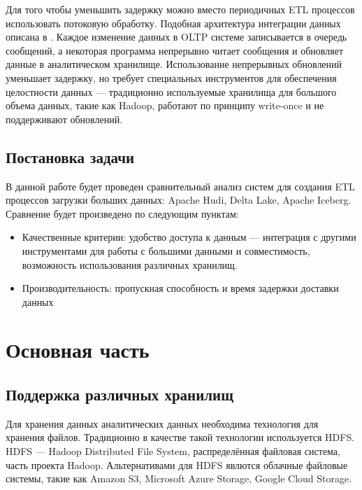 \documentclass[%
bachelor,    %
subf,        %
href,        %
colorlinks,  %
]{disser}
\begin{document}
Для того чтобы уменьшить задержку можно вместо периодичных ETL процессов использовать потоковую обработку.
Подобная архитектура интеграции данных описана в \cite{streaming_integration} \cite{streaming_integration_2}.
Каждое изменение данных в OLTP системе записывается в очередь сообщений, а некоторая программа непрерывно читает сообщения и обновляет данные в аналитическом хранилище.
Использование непрерывных обновлений уменьшает задержку, но требует специальных инструментов для обеспечения целостности данных --- традиционно используемые хранилища для большого объема данных, такие как Hadoop, работают по принципу write-once и не поддерживают обновлений.

\subsection{Постановка задачи}
В данной работе будет проведен сравнительный анализ систем для создания ETL процессов загрузки больших данных: Apache Hudi, Delta Lake, Apache Iceberg.
Сравнение будет произведено по следующим пунктам:
\begin{itemize}
	\item Качественные критерии: удобство доступа к данным --- интеграция с другими инструментами для работы с большими данными и совместимость, возможность использования различных хранилищ.

	\item Производительность: пропускная способность и время задержки доставки данных 

\end{itemize}
\newpage
\section{Основная часть}
\subsection{Поддержка различных хранилищ}
Для хранения данных аналитических данных необходима технология для хранения файлов. Традиционно в качестве такой технологии используется HDFS. HDFS  --- Hadoop Distributed File System, распределённая файловая система, часть проекта Hadoop. Альтернативами для HDFS явлются облачные файловые системы, такие как Amazon S3, Microsoft Azure Storage, Google Cloud Storage.
\end{document}
